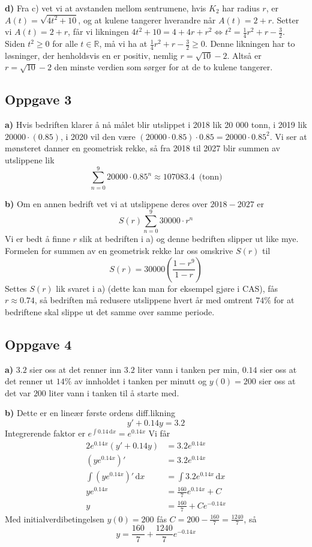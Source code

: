 \documentclass[12pt]{article}
\begin{document}
\begin{flushleft}
		\textbf{d)} Fra c) vet vi at avstanden mellom sentrumene, hvis $K_2$ har radius $r$, er $A(t)=\sqrt{4t^2+10}$, og at kulene tangerer hverandre når $A(t)=2+r$. Setter vi $A(t)=2+r$, får vi likningen $4t^2+10=4+4r+r^2 \Longleftrightarrow t^2 = \frac14r^2+r-\frac{3}{2}$. Siden $t^2\geq0$ for alle $t \in \mathbb{R}$, må vi ha at $\frac14r^2+r-\frac{3}{2}\geq0$. Denne likningen har to løsninger, der henholdsvis en er positiv, nemlig $r=\sqrt{10}-2$. Altså er $r=\sqrt{10}-2$ den minste verdien som sørger for at de to kulene tangerer.
		
		\subsection{Oppgave 3}
		\textbf{a)} Hvis bedriften klarer å nå målet blir utslippet i 2018 lik 20 000 tonn, i 2019 lik $20 000\cdot(0.85)$, i 2020 vil den være $(20000\cdot 0.85)\cdot 0.85 = 20000 \cdot 0.85^2$. Vi ser at mønsteret danner en geometrisk rekke, så fra 2018 til 2027 blir summen av utslippene lik $$\sum_{n=0}^9 20000\cdot 0.85^n \approx 107083.4 \, \text{ (tonn)}$$
		
		\textbf{b)} Om en annen bedrift vet vi at utslippene deres over $2018-2027$ er $$S(r)\sum_{n=0}^{9} 30000\cdot r^n$$ Vi er bedt å finne $r$ slik at bedriften i a) og denne bedriften slipper ut like mye. Formelen for summen av en geometrisk rekke lar oss omskrive $S(r)$ til $$S(r)=30000 \left(\frac{1-r^9}{1-r}\right)$$ Settes $S(r)$ lik svaret i a) (dette kan man for eksempel gjøre i CAS), fås $r\approx 0.74$, så bedriften må redusere utslippene hvert år med omtrent $74 \%$ for at bedriftene skal slippe ut det samme over samme periode.
		
		\subsection{Oppgave 4}
		\textbf{a)} $3.2$ sier oss at det renner inn $3.2$ liter vann i tanken per min, $0.14$ sier oss at det renner ut $14\%$ av innholdet i tanken per minutt og $y(0)=200$ sier oss at det var $200$ liter vann i tanken til å starte med. \newline
		
		\textbf{b)} Dette er en lineær første ordens diff.likning $$y'+0.14y=3.2$$ Integrerende faktor er $e^{\int 0.14 \, \text{d}x} = e^{0.14x}$ Vi får 
		\begin{alignat*}{2}
			e^{0.14x}\left(y'+0.14y\right) &= 3.2e^{0.14x} \\
			\left(ye^{0.14x} \right)' &= 3.2e^{0.14x} \\
			\int \left(ye^{0.14x} \right)' \, \text{d}x &= \int 3.2e^{0.14x} \, \text{d}x \\
			ye^{0.14x} &= \frac{160}{7}e^{0.14x} + C \\
			y &= \frac{160}{7} + Ce^{-0.14x}
		\end{alignat*}
		Med initialverdibetingelsen $y(0)=200$ fås $C=200-\frac{160}{7} = \frac{1240}{7}$, så $$y=\frac{160}{7} + \frac{1240}{7}e^{-0.14x}$$
		

\end{flushleft}
\end{document}
